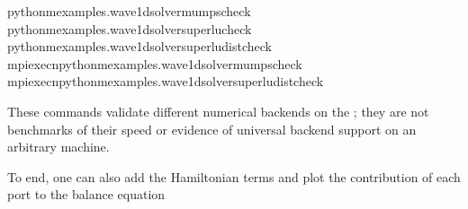 \documentclass[letterpaper,10pt,english]{sphinxmanual}
\begin{document}
\begin{sphinxVerbatim}[commandchars=\\\{\}]
python\PYGZhy{}mexamples.wave\PYGZus{}1d\PYGZhy{}\PYGZhy{}solvermumps\PYGZhy{}\PYGZhy{}check
python\PYGZhy{}mexamples.wave\PYGZus{}1d\PYGZhy{}\PYGZhy{}solversuperlu\PYGZhy{}\PYGZhy{}check
python\PYGZhy{}mexamples.wave\PYGZus{}1d\PYGZhy{}\PYGZhy{}solversuperlu\PYGZus{}dist\PYGZhy{}\PYGZhy{}check
mpiexec\PYGZhy{}npython\PYGZhy{}mexamples.wave\PYGZus{}1d\PYGZhy{}\PYGZhy{}solvermumps\PYGZhy{}\PYGZhy{}check
mpiexec\PYGZhy{}npython\PYGZhy{}mexamples.wave\PYGZus{}1d\PYGZhy{}\PYGZhy{}solversuperlu\PYGZus{}dist\PYGZhy{}\PYGZhy{}check
\end{sphinxVerbatim}

\sphinxAtStartPar
{}
These commands validate different numerical backends on the
; they are not benchmarks of their speed
or evidence of universal backend support on an arbitrary machine.

\sphinxAtStartPar
To end, one can also add the Hamiltonian terms and plot the contribution
of each port to the balance equation
\end{document}
